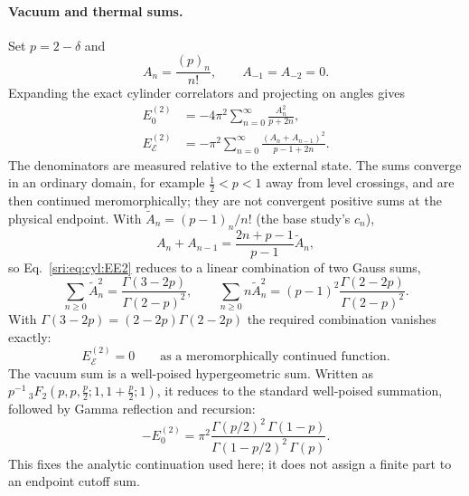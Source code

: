 \paragraph{Vacuum and thermal sums.} Set $p=2-\delta$ and
\begin{equation}
 A_n=\frac{(p)_n}{n!},\qquad A_{-1}=A_{-2}=0.
\end{equation}
Expanding the exact cylinder correlators and projecting on angles gives
\begin{align}
 E_0^{(2)}&=-4\pi^2\sum_{n=0}^\infty\frac{A_n^2}{p+2n},\label{sri:eq:cyl:E02}\\
 E_{\mathcal E}^{(2)}&=-\pi^2\sum_{n=0}^\infty\frac{(A_n+A_{n-1})^2}{p-1+2n}.\label{sri:eq:cyl:EE2}
\end{align}
The denominators are measured relative to the external state. The sums converge in an ordinary domain, for example
$\frac12<p<1$ away from level crossings, and are then continued meromorphically; they are not convergent positive sums
at the physical endpoint. With $\tilde A_n=(p-1)_n/n!$ (the base study's $c_n$),
\begin{equation}
 A_n+A_{n-1}=\frac{2n+p-1}{p-1}\tilde A_n,
\end{equation}
so Eq.~\eqref{sri:eq:cyl:EE2} reduces to a linear combination of two Gauss sums,
\begin{equation}
 \sum_{n\ge0}\tilde A_n^2=\frac{\Gamma(3-2p)}{\Gamma(2-p)^2},\qquad
 \sum_{n\ge0}n\tilde A_n^2=(p-1)^2\frac{\Gamma(2-2p)}{\Gamma(2-p)^2}.
\end{equation}
With $\Gamma(3-2p)=(2-2p)\Gamma(2-2p)$ the required combination vanishes exactly:
\begin{equation}
 E_{\mathcal E}^{(2)}=0\qquad\text{as a meromorphically continued function.}
\end{equation}
The vacuum sum is a well-poised hypergeometric sum. Written as $p^{-1}\,{}_3F_2(p,p,\frac p2;1,1+\frac p2;1)$, it
reduces to the standard well-poised summation, followed by Gamma reflection and recursion:
\begin{equation}
 -E_0^{(2)}=\pi^2\frac{\Gamma(p/2)^2\,\Gamma(1-p)}{\Gamma(1-p/2)^2\,\Gamma(p)}.
 \label{sri:eq:cyl:vac}
\end{equation}
This fixes the analytic continuation used here; it does not assign a finite part to an endpoint cutoff sum.

